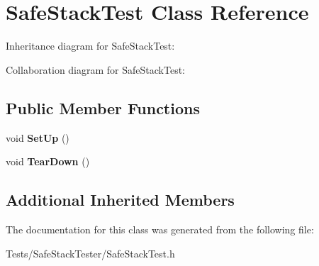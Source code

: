 \hypertarget{classSafeStackTest}{}\section{Safe\+Stack\+Test Class Reference}
\label{classSafeStackTest}


Inheritance diagram for Safe\+Stack\+Test\+:


Collaboration diagram for Safe\+Stack\+Test\+:
\subsection*{Public Member Functions}
\begin{DoxyCompactItemize}
\item 
\mbox{\label{classSafeStackTest_a1fdfc6b731eb55fc90eada6251f1bf62}} 
void {\bfseries Set\+Up} ()
\item 
\mbox{\label{classSafeStackTest_a8929c7f1ab403911f3ac63921929caab}} 
void {\bfseries Tear\+Down} ()
\end{DoxyCompactItemize}
\subsection*{Additional Inherited Members}


The documentation for this class was generated from the following file\+:\begin{DoxyCompactItemize}
\item 
Tests/\+Safe\+Stack\+Tester/Safe\+Stack\+Test.\+h\end{DoxyCompactItemize}
